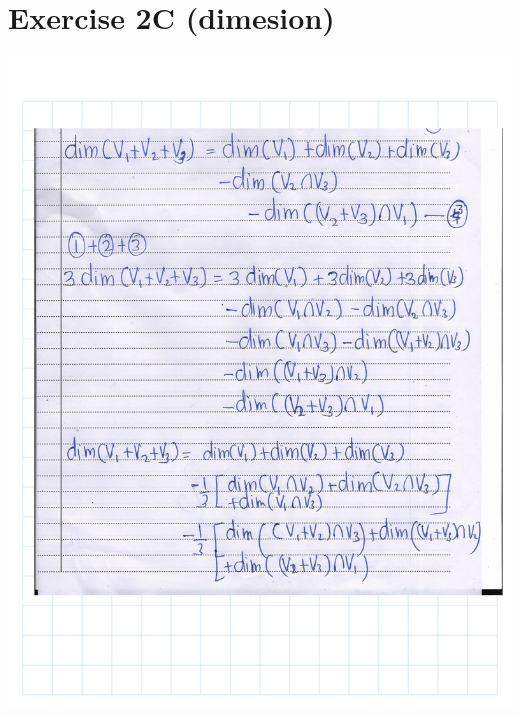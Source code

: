 \documentclass[
]{book}
\theoremstyle{definition}
\theoremstyle{definition}
\theoremstyle{definition}
\theoremstyle{definition}
\theoremstyle{remark}
\begin{document}
\section{Exercise 2C (dimesion)}\label{exercise-2c-dimesion}

\includegraphics{fig/Ex 2B and 2C/Ex 2c (1).png}
\end{document}
